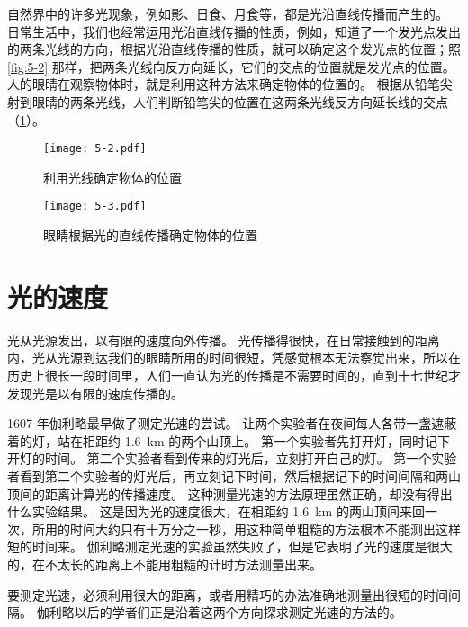 自然界中的许多光现象，例如影、日食、月食等，都是光沿直线传播而产生的。
日常生活中，我们也经常运用光沿直线传播的性质，例如，知道了一个发光点发出的两条光线的方向，根据光沿直线传播的性质，就可以确定这个发光点的位置；照\cref{fig:5-2} 那样，把两条光线向反方向延长，它们的交点的位置就是发光点的位置。
人的眼睛在观察物体时，就是利用这种方法来确定物体的位置的。
根据从铅笔尖射到眼睛的两条光线，人们判断铅笔尖的位置在这两条光线反方向延长线的交点（\cref{fig:5-3}）。
\begin{figure}
  \begin{minipage}[b]{0.45\linewidth}\centering
    \texttt{[image: 5-2.pdf]}
    \caption{利用光线确定物体的位置}\label{fig:5-2}
  \end{minipage}
  \begin{minipage}[b]{0.52\linewidth}
    \centering
    \texttt{[image: 5-3.pdf]}
    \caption{眼睛根据光的直线传播确定物体的位置}\label{fig:5-3}
    \end{minipage}
\end{figure}

\section{光的速度}
光从光源发出，以有限的速度向外传播。
光传播得很快，在日常接触到的距离内，光从光源到达我们的眼睛所用的时间很短，凭感觉根本无法察觉出来，所以在历史上很长一段时间里，人们一直认为光的传播是不需要时间的，直到十七世纪才发现光是以有限的速度传播的。

1607 年伽利略最早做了测定光速的尝试。
让两个实验者在夜间每人各带一盏遮蔽着的灯，站在相距约 \qty{1.6}{km} 的两个山顶上。
第一个实验者先打开灯，同时记下开灯的时间。
第二个实验者看到传来的灯光后，立刻打开自己的灯。
第一个实验者看到第二个实验者的灯光后，再立刻记下时间，然后根据记下的时间间隔和两山顶间的距离计算光的传播速度。
这种测量光速的方法原理虽然正确，却没有得出什么实验结果。
这是因为光的速度很大，在相距约 \qty{1.6}{km} 的两山顶间来回一次，所用的时间大约只有十万分之一秒，用这种简单粗糙的方法根本不能测出这样短的时间来。
伽利略测定光速的实验虽然失败了，但是它表明了光的速度是很大的，在不太长的距离上不能用粗糙的计时方法测量出来。

要测定光速，必须利用很大的距离，或者用精巧的办法准确地测量出很短的时间间隔。
伽利略以后的学者们正是沿着这两个方向探求测定光速的方法的。

